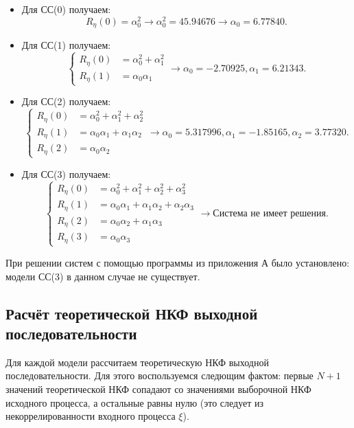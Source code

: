 \documentclass[12pt, fleqn]{article}
\begin{document}
{{{			\begin{itemize}
				\item {
					Для СС(0) получаем:
					\begin{equation*}
						R_{\eta}(0) = \alpha_0^2 \rightarrow \alpha_0^2 = 45.94676 \rightarrow \alpha_0 = 6.77840.
					\end{equation*}
				}
				\item {
					Для СС(1) получаем:
					\begin{equation*}
						\left\{
						\begin{split}
							R_{\eta}(0) &= \alpha_0^2 + \alpha_1^2 \\
							R_{\eta}(1) &= \alpha_0 \alpha_1
						\end{split}
						\right. \rightarrow \alpha_0 = -2.70925, \alpha_1 = 6.21343.
					\end{equation*}
				}
				\item {
					Для СС(2) получаем:
					\begin{equation*}
						\left\{
						\begin{split}
							R_{\eta}(0) &= \alpha_0^2 + \alpha_1^2 + \alpha_2^2 \\
							R_{\eta}(1) &= \alpha_0 \alpha_1 + \alpha_1 \alpha_2 \\
							R_{\eta}(2) &= \alpha_0 \alpha_2
						\end{split}
						\right. \rightarrow \alpha_0 = 5.317996, \alpha_1 = -1.85165, \alpha_2 = 3.77320.
					\end{equation*}
				}
				\item {
					Для СС(3) получаем:
					\begin{equation*}
						\left\{
						\begin{split}
							R_{\eta}(0) &= \alpha_0^2 + \alpha_1^2 + \alpha_2^2 + \alpha_3^2 \\
							R_{\eta}(1) &= \alpha_0 \alpha_1 + \alpha_1 \alpha_2 + \alpha_2 \alpha_3 \\
							R_{\eta}(2) &= \alpha_0 \alpha_2 + \alpha_1 \alpha_3 \\
							R_{\eta}(3) &= \alpha_0 \alpha_3
						\end{split}
						\right. \rightarrow \text{Система не имеет решения}.
					\end{equation*}
				}				
			\end{itemize}
						
			При решении систем с помощью программы из приложения А было установлено: модели СС(3) в данном случае не существует.
		}
		\subsection{Расчёт теоретической НКФ выходной последовательности} {
			Для каждой модели рассчитаем теоретическую НКФ выходной последовательности. Для этого воспользуемся следющим фактом: первые $N + 1$ значений теоретической НКФ сопадают со значениями выборочной НКФ исходного процесса, а остальные равны нулю (это следует из некоррелированности входного процесса $\xi$). \medskip
					
}}}
\end{document}
